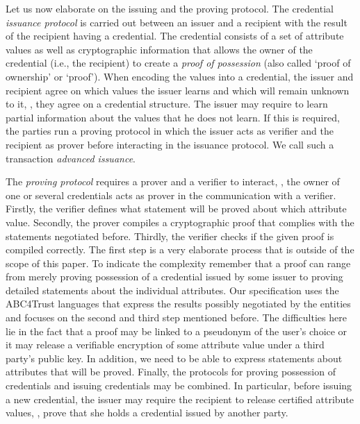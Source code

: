 Let us now elaborate on the issuing and the proving protocol.
The credential \emph{issuance protocol} is carried out between an issuer and a recipient with
the result of the recipient having a credential.
The credential consists of a set of attribute values as well as cryptographic information
that allows the owner of the credential (i.e., the recipient) to create a \emph{proof of
possession} (also called `proof of ownership' or `proof'). 
When encoding the values into a credential, the issuer and recipient agree on which values the
issuer learns and which will remain unknown to it, \ie, they agree on a credential
structure. 
The issuer may require to learn partial information about the values that he does not learn.
If this is required, the parties run a proving protocol in which the issuer acts as verifier and the
recipient as prover before interacting in the issuance protocol.
We call such a transaction \emph{advanced issuance}.


The \emph{proving protocol} requires a prover and a verifier to interact, \ie, the owner of
one or several credentials acts as prover in the communication with a verifier. 
Firstly, the verifier defines what statement will be proved about which
attribute value.
Secondly, the prover compiles a cryptographic proof that complies with the statements 
negotiated before.
Thirdly, the verifier checks if the given proof is compiled correctly. 
The first step is a very elaborate process that is outside of the scope of this paper.
To indicate the complexity remember that a proof can range from merely proving possession of
a credential issued by some issuer to proving detailed statements about the individual
attributes. 
Our specification uses the ABC4Trust languages that express the results possibly negotiated by the 
entities and focuses on the second and third step mentioned before. 
The difficulties here lie in the fact that a proof may be linked to a pseudonym of the user's
choice or it may release a verifiable encryption of some attribute value under a third
party's public key.
In addition, we need to be able to express statements about attributes that will be 
proved.
Finally, the protocols for proving possession of credentials and issuing
credentials may be combined.
In particular, before issuing a new credential, the issuer may require the recipient 
to release certified attribute values, \ie, prove that she holds a credential issued by
another party.

